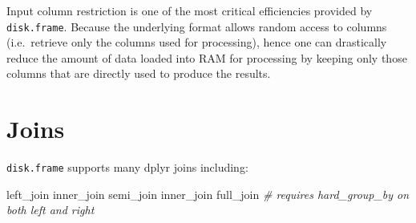 \documentclass[]{book}
\newenvironment{Shaded}{\begin{snugshade}}{\end{snugshade}}
\newcommand{\CommentTok}[1]{\textcolor[rgb]{0.56,0.35,0.01}{\textit{#1}}}
\newcommand{\DataTypeTok}[1]{\textcolor[rgb]{0.13,0.29,0.53}{#1}}
\newcommand{\KeywordTok}[1]{\textcolor[rgb]{0.13,0.29,0.53}{\textbf{#1}}}
\newcommand{\NormalTok}[1]{#1}
\newcommand{\OperatorTok}[1]{\textcolor[rgb]{0.81,0.36,0.00}{\textbf{#1}}}
\newcommand{\StringTok}[1]{\textcolor[rgb]{0.31,0.60,0.02}{#1}}
\begin{document}
\begin{Shaded}
\end{Shaded}

Input column restriction is one of the most critical efficiencies provided by \texttt{disk.frame}. Because the underlying format allows random access to columns (i.e.~retrieve only the columns used for processing), hence one can drastically reduce the amount of data loaded into RAM for processing by keeping only those columns that are directly used to produce the results.

\hypertarget{joins}{%
\section{Joins}\label{joins}}

\texttt{disk.frame} supports many dplyr joins including:

\begin{Shaded}
\begin{Highlighting}[]
\NormalTok{left_join}
\NormalTok{inner_join}
\NormalTok{semi_join}
\NormalTok{inner_join}
\NormalTok{full_join }\CommentTok{# requires hard_group_by on both left and right}
\end{Highlighting}
\end{Shaded}
\end{document}
